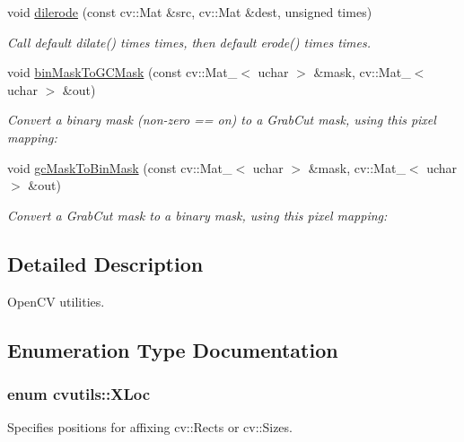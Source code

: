 \begin{DoxyCompactItemize}
void \hyperlink{namespacecvutils_a940f4f576e232256718ac607138d1a03}{dilerode} (const cv\-::\-Mat \&src, cv\-::\-Mat \&dest, unsigned times)
\begin{DoxyCompactList}\small\item\em Call default {\ttfamily dilate()} {\ttfamily times} times, then default {\ttfamily erode()} {\ttfamily times} times. \end{DoxyCompactList}\item 
void \hyperlink{namespacecvutils_a68b814f0c27087d28d1723ba68681858}{bin\-Mask\-To\-G\-C\-Mask} (const cv\-::\-Mat\-\_\-$<$ uchar $>$ \&mask, cv\-::\-Mat\-\_\-$<$ uchar $>$ \&out)
\begin{DoxyCompactList}\small\item\em Convert a binary mask (non-\/zero == on) to a Grab\-Cut mask, using this pixel mapping\-: \end{DoxyCompactList}\item 
void \hyperlink{namespacecvutils_a2a38c5f1b76d38eb5385bf0bd709a5ed}{gc\-Mask\-To\-Bin\-Mask} (const cv\-::\-Mat\-\_\-$<$ uchar $>$ \&mask, cv\-::\-Mat\-\_\-$<$ uchar $>$ \&out)
\begin{DoxyCompactList}\small\item\em Convert a Grab\-Cut mask to a binary mask, using this pixel mapping\-: \end{DoxyCompactList}\end{DoxyCompactItemize}


\subsection{Detailed Description}
Open\-C\-V utilities. 

\subsection{Enumeration Type Documentation}
\hypertarget{namespacecvutils_a955c1d8733f727414da8a357b938ced7}{
\subsubsection[{X\-Loc}]{\setlength{\rightskip}{0pt plus 5cm}enum {\bf cvutils\-::\-X\-Loc}}}\label{namespacecvutils_a955c1d8733f727414da8a357b938ced7}


Specifies positions for affixing {\ttfamily cv\-::\-Rect}s or {\ttfamily cv\-::\-Size}s. 

